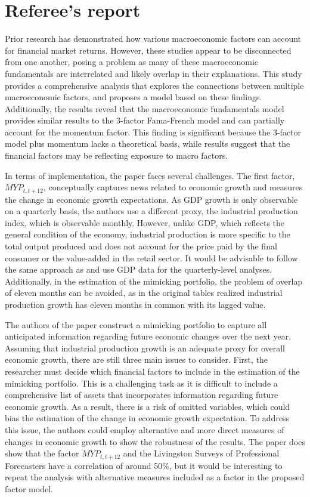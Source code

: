 \documentclass[12pt,a4paper]{ouparticle}
\begin{document}
\section{Referee's report}
Prior research has demonstrated how various macroeconomic factors can account for financial market returns. However, these studies appear to be disconnected from one another, posing a problem as many of these macroeconomic fundamentals are interrelated and likely overlap in their explanations. This study provides a comprehensive analysis that explores the connections between multiple macroeconomic factors, and proposes a model based on these findings. Additionally, the results reveal that the macroeconomic fundamentals model provides similar results to the 3-factor Fama-French model and can partially account for the momentum factor. This finding is significant because the 3-factor model plus momentum lacks a theoretical basis, while results suggest that the financial factors may be reflecting exposure to macro factors.

In terms of implementation, the paper faces several challenges. The first factor, $MYP_{t,t+12}$, conceptually captures news related to economic growth and measures the change in economic growth expectations. As GDP growth is only observable on a quarterly basis, the authors use a different proxy, the industrial production index, which is observable monthly. However, unlike GDP, which reflects the general condition of the economy, industrial production is more specific to the total output produced and does not account for the price paid by the final consumer or the value-added in the retail sector. It would be advisable to follow the same approach as \cite{vassalou2003news} and use GDP data for the quarterly-level analyses. Additionally, in the estimation of the mimicking portfolio, the problem of overlap of eleven months can be avoided, as in the original tables realized industrial production growth has eleven months in common with its lagged value.

The authors of the paper construct a mimicking portfolio to capture all anticipated information regarding future economic changes over the next year. Assuming that industrial production growth is an adequate proxy for overall economic growth, there are still three main issues to consider. First, the researcher must decide which financial factors to include in the estimation of the mimicking portfolio. This is a challenging task as it is difficult to include a comprehensive list of assets that incorporates information regarding future economic growth. As a result, there is a risk of omitted variables, which could bias the estimation of the change in economic growth expectation. To address this issue, the authors could employ alternative and more direct measures of changes in economic growth to show the robustness of the results. The paper does show that the factor $MYP_{t,t+12}$ and the Livingston Surveys of Professional Forecasters have a correlation of around 50\%, but it would be interesting to repeat the analysis with alternative measures included as a factor in the proposed factor model.
\end{document}
